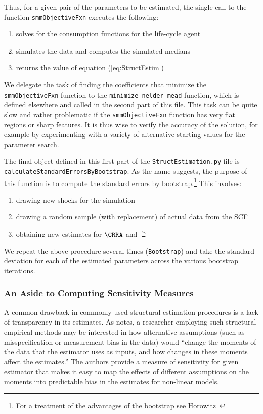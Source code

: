 Thus, for a given pair of the parameters to be estimated, the single
call to the function \texttt{smmObjectiveFxn} executes the following:
\begin{enumerate}
\item solves for the consumption functions for the life-cycle agent
\item simulates the data and computes the simulated medians
\item returns the value of equation (\ref{eq:StructEstim})
\end{enumerate}

We delegate the task of finding the coefficients that minimize the \texttt{smmObjectiveFxn} function to the \texttt{minimize\_nelder\_mead} function, which is defined elsewhere and called in the second part of this file.  This task can be quite slow and rather problematic if the \texttt{smmObjectiveFxn} function has very flat regions or sharp features. It is thus wise to verify the accuracy of the solution, for example by experimenting with a variety of alternative starting values for the parameter search.

The final object defined in this first part of the \texttt{StructEstimation.py}
file is \texttt{calculateStandardErrorsByBootstrap}. As the name suggests, the
purpose of this function is to compute the standard errors by bootstrap.\footnote{For a
  treatment of the advantages of the bootstrap see
  Horowitz~\citeyearpar{horowitzBootstrap}} This involves:
\begin{enumerate}
\item drawing new shocks for the simulation
\item drawing a random sample (with replacement) of actual data from the SCF
\item obtaining new estimates for $\CRRA$ and $\beth$
\end{enumerate}
We repeat the above procedure several times (\texttt{Bootstrap}) and
take the standard deviation for each of the estimated parameters across the various bootstrap iterations.

\hypertarget{sensitivity-measures}{}
\subsubsection{An Aside to Computing Sensitivity Measures}\label{subsubsec:sensmeas}


A common drawback in commonly used structural estimation procedures is a lack of transparency in its estimates.  As \cite{andrews2017measuring} notes, a researcher employing such structural empirical methods may be interested in how alternative assumptions (such as misspecification or measurement bias in the data) would ``change the moments of the data that the estimator uses as inputs, and how changes in these moments affect the estimates.'' The authors provide a measure of sensitivity for given estimator that makes it easy to map the effects of different assumptions on the moments into predictable bias in the estimates for non-linear models.

